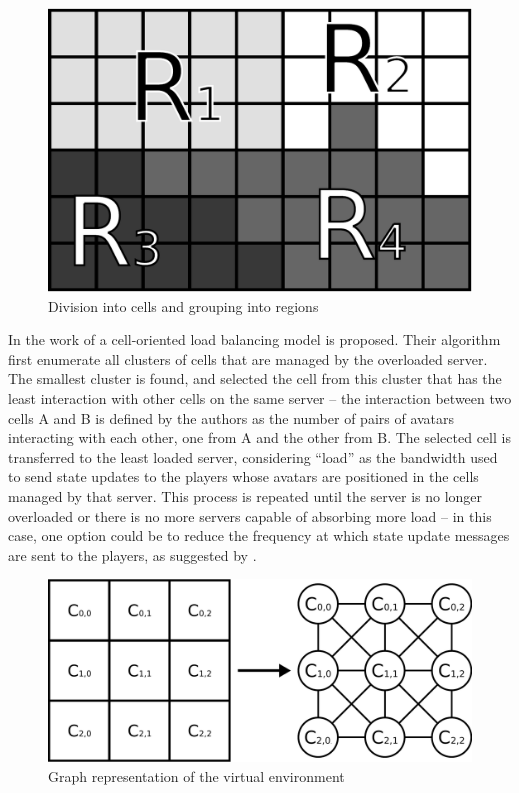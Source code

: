 \documentclass[acmjacm]{acmtrans2m}
\begin{document}
\begin{figure}[!t]
	\centering
	\includegraphics[width=0.4\linewidth]{images/macromicro}
	\caption{Division into cells and grouping into regions}
	\label{fig:cells}
\end{figure}

In the work of \cite{ahmed2008mol} a cell-oriented load balancing model is proposed. Their algorithm first enumerate all clusters of cells that are managed by the overloaded server. The smallest cluster is found, and selected the cell from this cluster that has the least interaction with other cells on the same server -- the interaction between two cells A and B is defined by the authors as the number of pairs of avatars interacting with each other, one from A and the other from B. The selected cell is transferred to the least loaded server, considering ``load'' as the bandwidth used to send state updates to the players whose avatars are positioned in the cells managed by that server. This process is repeated until the server is no longer overloaded or there is no more servers capable of absorbing more load -- in this case, one option could be to reduce the frequency at which state update messages are sent to the players, as suggested by \cite{bezerra2008a3}.

\begin{figure}[!t]
	\centering
	\includegraphics[width=0.7\linewidth]{images/grafo}
	\caption{Graph representation of the virtual environment}
	\label{fig:graph}
\end{figure}
\end{document}
